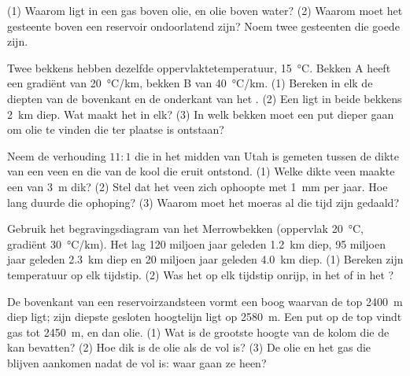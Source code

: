 \begin{exercise}[$\star$]\label{exo:g11:fossil-fuel-geology:5}
(1) Waarom ligt in een  gas boven olie, en olie boven water? (2) Waarom
moet het gesteente boven een reservoir ondoorlatend zijn? Noem twee gesteenten die
goede  zijn.
\end{exercise}

\begin{exercise}[$\star\star$]\label{exo:g11:fossil-fuel-geology:6}
Twee bekkens hebben dezelfde oppervlaktetemperatuur, \qty{15}{\degreeCelsius}.
Bekken A heeft een gradiënt van \qty{20}{\degreeCelsius/km}, bekken B van
\qty{40}{\degreeCelsius/km}. (1) Bereken in elk de diepten van de bovenkant en de onderkant
van het . (2) Een  ligt in beide bekkens \qty{2}{km} diep.
Wat maakt het in elk? (3) In welk bekken moet een put dieper gaan
om olie te vinden die ter plaatse is ontstaan?
\end{exercise}

\begin{exercise}[$\star\star$]\label{exo:g11:fossil-fuel-geology:7}
Neem de verhouding $11{:}1$ die in het midden van Utah is gemeten tussen de dikte van een
veen en die van de kool die eruit ontstond. (1) Welke dikte veen maakte een
 van \qty{3}{m} dik? (2) Stel dat het veen zich ophoopte met \qty{1}{mm} per jaar.
Hoe lang duurde die ophoping? (3) Waarom moet het moeras al die tijd zijn
gedaald?
\end{exercise}

\begin{exercise}[$\star\star$]\label{exo:g11:fossil-fuel-geology:8}
Gebruik het begravingsdiagram van het Merrowbekken (oppervlak
\qty{20}{\degreeCelsius}, gradiënt \qty{30}{\degreeCelsius/km}). Het
 lag 120 miljoen jaar geleden \qty{1.2}{km} diep, 95
miljoen jaar geleden \qty{2.3}{km} diep en 20 miljoen jaar geleden \qty{4.0}{km} diep. (1) Bereken
zijn temperatuur op elk tijdstip. (2) Was het op elk tijdstip onrijp, in het
 of in het ?
\end{exercise}

\begin{exercise}[$\star\star$]\label{exo:g11:fossil-fuel-geology:9}
De bovenkant van een reservoirzandsteen vormt een boog waarvan de top \qty{2400}{m}
diep ligt; zijn diepste gesloten hoogtelijn ligt op \qty{2580}{m}. Een put op de top
vindt gas tot \qty{2450}{m}, en dan olie. (1) Wat is de grootste hoogte van de
kolom die de  kan bevatten? (2) Hoe dik is de olie als de  vol is?
(3) De olie en het gas die blijven aankomen nadat de  vol is: waar gaan
ze heen?
\end{exercise}

